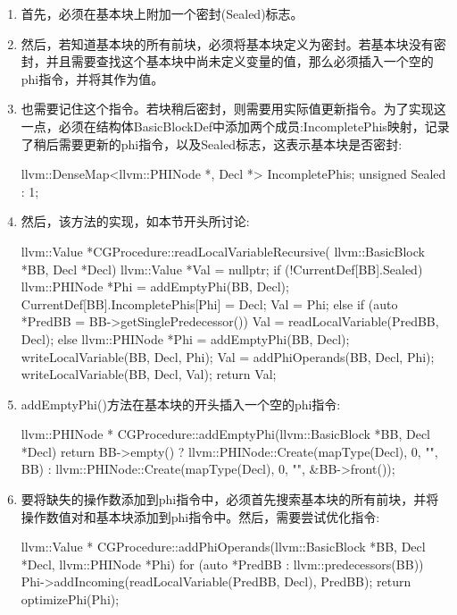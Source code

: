 \begin{enumerate}
\item
首先，必须在基本块上附加一个密封(Sealed)标志。

\item
然后，若知道基本块的所有前块，必须将基本块定义为密封。若基本块没有密封，并且需要查找这个基本块中尚未定义变量的值，那么必须插入一个空的phi指令，并将其作为值。

\item
也需要记住这个指令。若块稍后密封，则需要用实际值更新指令。为了实现这一点，必须在结构体BasicBlockDef中添加两个成员:IncompletePhis映射，记录了稍后需要更新的phi指令，以及Sealed标志，这表示基本块是否密封:

\begin{cpp}
llvm::DenseMap<llvm::PHINode *, Decl *> IncompletePhis;
unsigned Sealed : 1;
\end{cpp}

\item
然后，该方法的实现，如本节开头所讨论:

\begin{cpp}
llvm::Value *CGProcedure::readLocalVariableRecursive(
        llvm::BasicBlock *BB, Decl *Decl) {
    llvm::Value *Val = nullptr;
    if (!CurrentDef[BB].Sealed) {
        llvm::PHINode *Phi = addEmptyPhi(BB, Decl);
        CurrentDef[BB].IncompletePhis[Phi] = Decl;
        Val = Phi;
    } else if (auto *PredBB = BB->getSinglePredecessor()) {
        Val = readLocalVariable(PredBB, Decl);
    } else {
        llvm::PHINode *Phi = addEmptyPhi(BB, Decl);
        writeLocalVariable(BB, Decl, Phi);
        Val = addPhiOperands(BB, Decl, Phi);
    }
    writeLocalVariable(BB, Decl, Val);
    return Val;
}
\end{cpp}

\item
addEmptyPhi()方法在基本块的开头插入一个空的phi指令:

\begin{cpp}
llvm::PHINode *
CGProcedure::addEmptyPhi(llvm::BasicBlock *BB,
        Decl *Decl) {
    return BB->empty()
        ? llvm::PHINode::Create(mapType(Decl), 0,
                                "", BB)
        : llvm::PHINode::Create(mapType(Decl), 0,
                                "", &BB->front());
}
\end{cpp}

\item
要将缺失的操作数添加到phi指令中，必须首先搜索基本块的所有前块，并将操作数值对和基本块添加到phi指令中。然后，需要尝试优化指令:

\begin{cpp}
llvm::Value *
CGProcedure::addPhiOperands(llvm::BasicBlock *BB,
                            Decl *Decl,
                            llvm::PHINode *Phi) {
    for (auto *PredBB : llvm::predecessors(BB))
        Phi->addIncoming(readLocalVariable(PredBB, Decl),
                         PredBB);
    return optimizePhi(Phi);
}
\end{cpp}

\end{enumerate}

